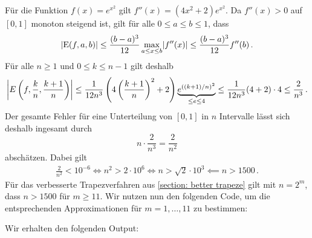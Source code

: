 \section{}

Für die Funktion $f(x) = e^{x^2}$ gilt $f''(x) = (4x^2 + 2) e^{x^2}$.
Da $f''(x) > 0$ auf $[0,1]$ monoton steigend ist, gilt für alle $0 \leq a \leq b \leq 1$, dass
\[
        \abs{ \operatorname{E}(f,a,b) }
  \leq  \frac{(b-a)^3}{12} \max_{a \leq x \leq b} \abs{f''(x)}
  \leq  \frac{(b-a)^3}{12} f''(b)\,.
\]
Für alle $n \geq 1$ und $0 \leq k \leq n-1$ gilt deshalb
\[
        \abs*{ E\left( f, \frac{k}{n}, \frac{k+1}{n} \right) }
  \leq  \frac{1}{12 n^3} \left( 4 \left(\frac{k+1}{n}\right)^2 + 2 \right) \underbrace{e^{((k+1)/n)^2}}_{\leq e \leq 4}
  \leq  \frac{1}{12 n^3} (4 + 2) \cdot 4
  \leq  \frac{2}{n^3}\,.
\]
Der gesamte Fehler für eine Unterteilung von $[0,1]$ in $n$ Intervalle lässt sich deshalb ingesamt durch
\[
      n \cdot \frac{2}{n^3}
    = \frac{2}{n^2}
\]
abschätzen.
Dabei gilt
\begin{align*}
              \frac{2}{n^2} < 10^{-6}
  \iff        n^2 > 2 \cdot 10^6
  \iff        n > \sqrt{2} \cdot 10^3
  \impliedby  n > 1500\,.
\end{align*}
Für das verbesserte Trapezverfahren aus \ref{section: better trapeze} gilt mit $n = 2^m$, dass $n > 1500$ für $m \geq 11$.
Wir nutzen nun den folgenden Code, um die entsprechenden Approximationen für $m = 1, \dotsc, 11$ zu bestimmen:



Wir erhalten den folgenden Output:

